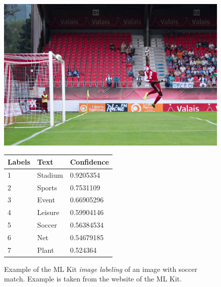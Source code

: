 \documentclass[thesis=B,english]{FITthesis}[2019/12/23]
\begin{document}
\begin{figure}
    \centering
    \begin{minipage}[]{.312\linewidth}
        \includegraphics[width = \linewidth] {pictures/1024px-Valais_Cup_2013_-_OM-FC_Porto_13-07-2013_-_Brice_Samba_en_extension.jpg}
    \end{minipage}
    \begin{minipage}[]{.472\linewidth}
\begin{tabular}{|l|l|l|}
\hline
\textbf{Labels} & \textbf{Text} & \textbf{Confidence} \\ \hline
1               & Stadium       & 0.9205354           \\ \hline
2               & Sports        & 0.7531109           \\ \hline
3               & Event         & 0.66905296          \\ \hline
4               & Leisure       & 0.59904146          \\ \hline
5               & Soccer        & 0.56384534          \\ \hline
6               & Net           & 0.54679185          \\ \hline
7               & Plant         & 0.524364            \\ \hline
\end{tabular}
    \end{minipage}
    \caption[ML Kit \textit{image labeling} example]{Example of the ML Kit \textit{image labeling} of an image with soccer match. Example is taken from the website of the ML Kit.}
\label{table:ML_Kit_image_labeling_example}
\end{figure}
\end{document}
